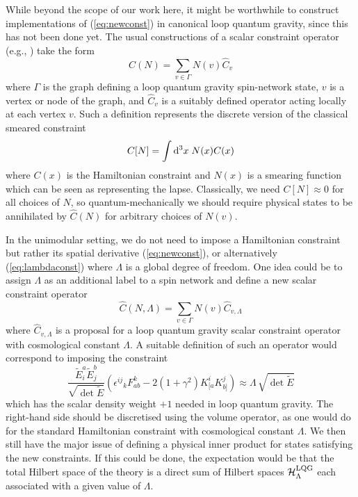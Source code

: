 \documentclass[aps,prd,11pt,showkeys,nofootinbib]{revtex4-2}
\begin{document}
While beyond the scope of our work here, it might be worthwhile to construct implementations of (\ref{eq:newconst}) in canonical loop quantum gravity, since this has not been done yet. The usual constructions of a scalar constraint operator (e.g., \cite{Assanioussi:2015gka}) take the form
\begin{equation}
    \hat{C}(N) = \sum_{v\in \Gamma} N(v)\hat{C}_v
\end{equation}
where $\Gamma$ is the graph defining a loop quantum gravity spin-network state, $v$ is a vertex or node of the graph, and $\hat{C}_v$ is a suitably defined operator acting locally at each vertex $v$. Such a definition represents the discrete version of the classical smeared constraint 
\begin{equation}
C[N]=\int {\rm d}^3 x\;N(x)C(x)
\end{equation}
where $C(x)$ is the Hamiltonian constraint and $N(x)$ is a smearing function which can be seen as representing the lapse. Classically, we need $C[N]\approx 0$ for all choices of $N$, so quantum-mechanically we should require physical states to be annihilated by $\hat{C}(N)$ for arbitrary choices of $N(v)$.

In the unimodular setting, we do not need to impose a Hamiltonian constraint but rather its spatial derivative (\ref{eq:newconst}), or alternatively (\ref{eq:lambdaconst}) where $\Lambda$ is a global degree of freedom. One idea could be to assign $\Lambda$ as an additional label to a spin network and define a new scalar constraint operator
\begin{equation}
    \hat{C}(N,\Lambda) = \sum_{v\in \Gamma} N(v)\hat{C}_{v,\Lambda}
\end{equation}
where $\hat{C}_{v,\Lambda}$ is a proposal for a loop quantum gravity scalar constraint operator with cosmological constant $\Lambda$. A suitable definition of such an operator would correspond to imposing the constraint
\begin{equation}
\frac{\tilde{E}^a_i\tilde{E}^b_j}{\sqrt{\det \tilde{E}}}\left({\epsilon^{ij}}_k F^k_{ab}-2(1+\gamma^2)K^i_{[a}K^j_{b]}\right) \approx \Lambda\,\sqrt{\det\tilde{E}}
\end{equation}
which has the scalar density weight $+1$ needed in loop quantum gravity. The right-hand side should be discretised using the volume operator, as one would do for the standard Hamiltonian constraint with cosmological constant $\Lambda$. We then still have the major issue of defining a physical inner product for states satisfying the new constraints. If this could be done, the expectation would be that the total Hilbert space of the theory is a direct sum of Hilbert spaces $\mathcal{H}_\Lambda^{{\rm LQG}}$ each associated with a given value of $\Lambda$.
\end{document}
